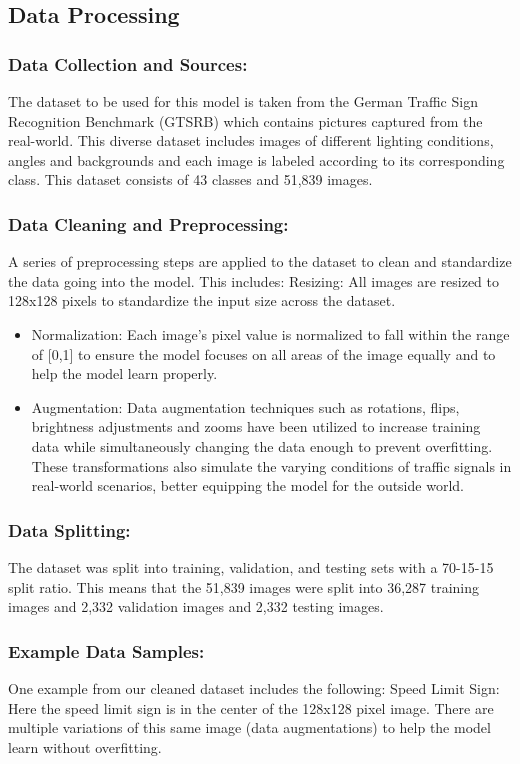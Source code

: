 \documentclass{article} %
\begin{document}
\subsection{Data Processing}
\subsubsection{Data Collection and Sources:}
The dataset to be used for this model is taken from the German Traffic Sign Recognition Benchmark (GTSRB) which contains pictures captured from the real-world. This diverse dataset includes images of different lighting conditions, angles and backgrounds and each image is labeled according to its corresponding class. This dataset consists of 43 classes and 51,839 images.
\subsubsection{Data Cleaning and Preprocessing:}
A series of preprocessing steps are applied to the dataset to clean and standardize the data going into the model. This includes:
Resizing: All images are resized to 128x128 pixels to standardize the input size across the dataset. 
\begin{itemize}
    \item Normalization: Each image’s pixel value is normalized to fall within the range of [0,1] to ensure the model focuses on all areas of the image equally and to help the model learn properly.
    \item Augmentation: Data augmentation techniques such as rotations, flips, brightness adjustments and zooms have been utilized to increase training data while simultaneously changing the data enough to prevent overfitting. These transformations also simulate the varying conditions of traffic signals in real-world scenarios, better equipping the model for the outside world.
\end{itemize}
\subsubsection{Data Splitting:}
The dataset was split into training, validation, and testing sets with a 70-15-15 split ratio. This means that the 51,839 images were split into 36,287 training images and 2,332 validation images and 2,332 testing images.
\subsubsection{Example Data Samples:}
One example from our cleaned dataset includes the following:
Speed Limit Sign: Here the speed limit sign is in the center of the 128x128 pixel image. There are multiple variations of this same image (data augmentations) to help the model learn without overfitting.
\end{document}
